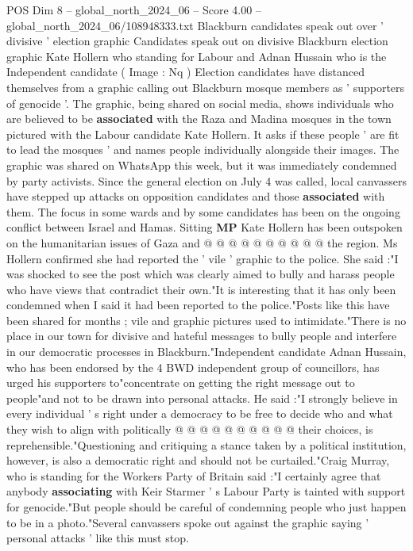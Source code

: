 \begin{textsample}{POS Dim 8 – global\_north\_2024\_06 – Score 4.00 – global\_north\_2024\_06/108948333.txt}  \label{ex:f8_pos_256}
Blackburn candidates speak out over ' divisive ' election graphic Candidates speak out on divisive Blackburn election graphic Kate Hollern who standing for Labour and Adnan Hussain who is the Independent candidate ( Image : Nq ) Election candidates have distanced themselves from a graphic calling out Blackburn mosque members as ' supporters of genocide '.
The graphic, being shared on social media, shows individuals who are believed to be \textbf{associated} with the Raza and Madina mosques in the town pictured with the Labour candidate Kate Hollern.
It asks if these people ' are fit to lead the mosques ' and names people individually alongside their images.
The graphic was shared on WhatsApp this week, but it was immediately condemned by party activists.
Since the general election on July 4 was called, local canvassers have stepped up attacks on opposition candidates and those \textbf{associated} with them.
The focus in some wards and by some candidates has been on the ongoing conflict between Israel and Hamas.
Sitting \textbf{MP} Kate Hollern has been outspoken on the humanitarian issues of Gaza and @ @ @ @ @ @ @ @ @ @ the region.
Ms Hollern confirmed she had reported the ' vile ' graphic to the police.
She said :"I was shocked to see the post which was clearly aimed to bully and harass people who have views that contradict their own."It is interesting that it has only been condemned when I said it had been reported to the police."Posts like this have been shared for months ; vile and graphic pictures used to intimidate."There is no place in our town for divisive and hateful messages to bully people and interfere in our democratic processes in Blackburn."Independent candidate Adnan Hussain, who has been endorsed by the 4 BWD independent group of councillors, has urged his supporters to"concentrate on getting the right message out to people"and not to be drawn into personal attacks.
He said :"I strongly believe in every individual ' s right under a democracy to be free to decide who and what they wish to align with politically @ @ @ @ @ @ @ @ @ @ their choices, is reprehensible."Questioning and critiquing a stance taken by a political institution, however, is also a democratic right and should not be curtailed."Craig Murray, who is standing for the Workers Party of Britain said :"I certainly agree that anybody \textbf{associating} with Keir Starmer ' s Labour Party is tainted with support for genocide."But people should be careful of condemning people who just happen to be in a photo."Several canvassers spoke out against the graphic saying ' personal attacks ' like this must stop.

\end{textsample}
